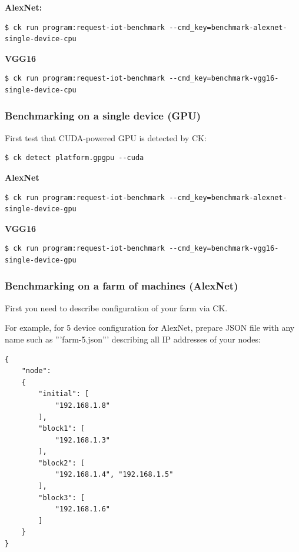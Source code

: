 \documentclass[sigplan]{acmart}
\begin{document}
\textbf{AlexNet:}

\begin{verbatim}
$ ck run program:request-iot-benchmark --cmd_key=benchmark-alexnet-single-device-cpu 
\end{verbatim}

\textbf{VGG16}

\begin{verbatim}
$ ck run program:request-iot-benchmark --cmd_key=benchmark-vgg16-single-device-cpu
\end{verbatim}
\subsubsection{Benchmarking on a single device (GPU)}

First test that CUDA-powered GPU is detected by CK:

\begin{verbatim}$ ck detect platform.gpgpu --cuda\end{verbatim}

\textbf{AlexNet}

\begin{verbatim}
$ ck run program:request-iot-benchmark --cmd_key=benchmark-alexnet-single-device-gpu 
\end{verbatim}

\textbf{VGG16}

\begin{verbatim}
$ ck run program:request-iot-benchmark --cmd_key=benchmark-vgg16-single-device-gpu
\end{verbatim}

\subsubsection{Benchmarking on a farm of machines (AlexNet)}

First you need to describe configuration of your farm via CK. 

For example, for 5 device configuration for AlexNet,
prepare JSON file with any name such as '''farm-5.json''' 
describing all IP addresses of your nodes:

\begin{verbatim}
{
    "node":
    {
        "initial": [
            "192.168.1.8"
        ],
        "block1": [
            "192.168.1.3"
        ],
        "block2": [
            "192.168.1.4", "192.168.1.5"
        ],
        "block3": [
            "192.168.1.6"
        ]
    }
}
\end{verbatim}
\end{document}
